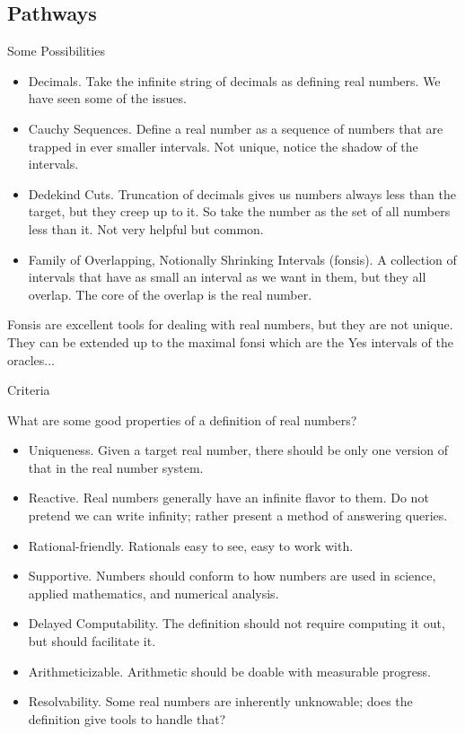\documentclass{beamer}
\begin{document}
\subsection{Pathways}

\begin{frame}{Some Possibilities}
    \begin{itemize}
        \item Decimals. Take the infinite string of decimals as defining real numbers. We have seen some of the issues. 
        \item Cauchy Sequences. Define a real number as a sequence of numbers that are trapped in ever smaller intervals. Not unique, notice the shadow of the intervals.   
        \item Dedekind Cuts. Truncation of decimals gives us numbers always less than the target, but they creep up to it. So take the number as the set of all numbers less than it. Not very helpful but common.
        \item Family of Overlapping, Notionally Shrinking Intervals (fonsis). A collection of intervals that have as small an interval as we want in them, but they all overlap. The core of the overlap is the real number. 
    \end{itemize}

Fonsis are excellent tools for dealing with real numbers, but they are not unique. They can be extended up to the maximal fonsi which are the Yes intervals of the oracles...
    
\end{frame}

\begin{frame}{Criteria}
    

What are some good properties of a definition of real numbers? 

\begin{itemize}
    \item Uniqueness. Given a target real number, there should be only one version of that in the real number system.
    \item Reactive. Real numbers generally have an infinite flavor to them. Do not pretend we can write infinity; rather present a method of answering queries. 
    \item Rational-friendly. Rationals easy to see, easy to work with. 
    \item Supportive. Numbers should conform to how numbers are used in science, applied mathematics, and numerical analysis. 
    \item Delayed Computability. The definition should not require computing it out, but should facilitate it. 
    \item Arithmeticizable. Arithmetic should be doable with measurable progress. 
    \item Resolvability. Some real numbers are inherently unknowable; does the definition give tools to handle that? 
\end{itemize}

\end{frame}
\end{document}
